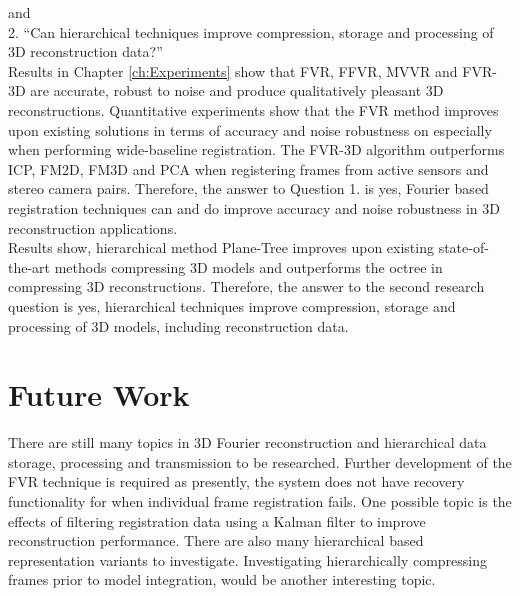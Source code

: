 and \\

2. ``Can hierarchical techniques improve compression, storage and processing of 3D reconstruction data?'' \\


Results in Chapter \ref{ch:Experiments} show that FVR, FFVR, MVVR and FVR-3D are accurate, robust to noise and produce qualitatively pleasant 3D reconstructions. Quantitative experiments show that the FVR method improves upon existing solutions in terms of accuracy and noise robustness on especially when performing wide-baseline registration. The FVR-3D algorithm outperforms ICP, FM2D, FM3D and PCA when registering frames from active sensors and stereo camera pairs. Therefore, the answer to Question 1. is yes, Fourier based registration techniques can and do improve accuracy and noise robustness in 3D reconstruction applications. \\


Results show, hierarchical method Plane-Tree improves upon existing state-of-the-art methods compressing 3D models and outperforms the octree in compressing 3D reconstructions. Therefore, the answer to the second research question is yes, hierarchical techniques improve compression, storage and processing of 3D models, including reconstruction data. \\

\section{Future Work}

There are still many topics in 3D Fourier reconstruction and hierarchical data storage, processing and transmission to be researched. Further development of the FVR technique is required as presently, the system does not have recovery functionality for when individual frame registration fails. One possible topic is the effects of filtering registration data using a Kalman filter to improve reconstruction performance. There are also many hierarchical based representation variants to investigate. Investigating hierarchically compressing frames prior to model integration, would be another interesting topic. \\
